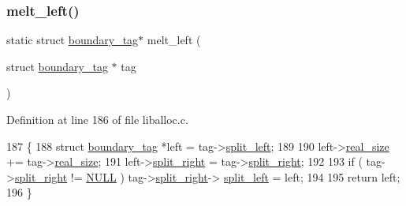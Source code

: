 \mbox{\label{a00023_a7ea762780416b837601691f20e085cc2_a7ea762780416b837601691f20e085cc2}} 
\subsubsection{\texorpdfstring{melt\+\_\+left()}{melt\_left()}}
{\footnotesize\ttfamily static struct \hyperlink{a00095}{boundary\+\_\+tag}$\ast$ melt\+\_\+left (\begin{DoxyParamCaption}\item[{struct \hyperlink{a00095}{boundary\+\_\+tag} $\ast$}]{tag }\end{DoxyParamCaption})\hspace{0.3cm}{\ttfamily [static]}}



Definition at line 186 of file liballoc.\+c.


\begin{DoxyCode}
187 \{
188     \textcolor{keyword}{struct }\hyperlink{a00095}{boundary\_tag} *left = tag->\hyperlink{a00095_a4daa8c3768359ea8d0f46ef907616cc2_a4daa8c3768359ea8d0f46ef907616cc2}{split\_left};
189                             
190     left->\hyperlink{a00095_ad22b1c69bdce419783ac165f7f354245_ad22b1c69bdce419783ac165f7f354245}{real\_size}   += tag->\hyperlink{a00095_ad22b1c69bdce419783ac165f7f354245_ad22b1c69bdce419783ac165f7f354245}{real\_size};
191     left->\hyperlink{a00095_a9d43c9c4ff5ae35908dcfed0aec1907a_a9d43c9c4ff5ae35908dcfed0aec1907a}{split\_right}  = tag->\hyperlink{a00095_a9d43c9c4ff5ae35908dcfed0aec1907a_a9d43c9c4ff5ae35908dcfed0aec1907a}{split\_right};
192     
193     \textcolor{keywordflow}{if} ( tag->\hyperlink{a00095_a9d43c9c4ff5ae35908dcfed0aec1907a_a9d43c9c4ff5ae35908dcfed0aec1907a}{split\_right} != \hyperlink{a00026_a070d2ce7b6bb7e5c05602aa8c308d0c4_a070d2ce7b6bb7e5c05602aa8c308d0c4}{NULL} ) tag->\hyperlink{a00095_a9d43c9c4ff5ae35908dcfed0aec1907a_a9d43c9c4ff5ae35908dcfed0aec1907a}{split\_right}->
      \hyperlink{a00095_a4daa8c3768359ea8d0f46ef907616cc2_a4daa8c3768359ea8d0f46ef907616cc2}{split\_left} = left;
194 
195     \textcolor{keywordflow}{return} left;
196 \}
\end{DoxyCode}
\mbox{\label{a00023_ac5f241a082afc3c26df1eb7dfdd8d8e0_ac5f241a082afc3c26df1eb7dfdd8d8e0}} 
